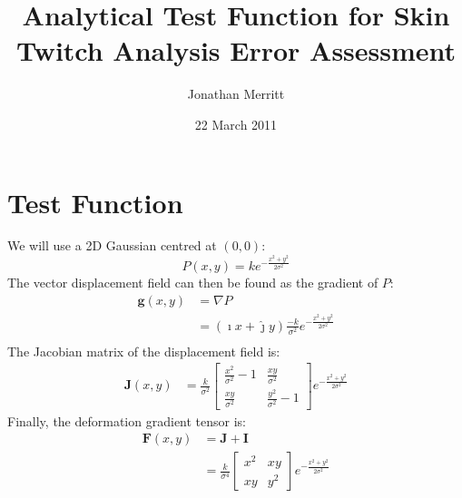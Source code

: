 \documentclass[a4paper,11pt,abstract=false]{scrartcl}
\title{Analytical Test Function for Skin Twitch Analysis Error Assessment}
\author{Jonathan Merritt}
\date{22 March 2011}
\newcommand{\vect}[1]{\ensuremath{\mathbf{#1}}}
\newcommand{\matr}[1]{\ensuremath{\mathbf{#1}}}
\newcommand{\eterm}{\ensuremath{e ^ {-\frac{x^2 + y^2}{2 \sigma^2}}}}
\begin{document}
\maketitle

\section{Test Function}

We will use a 2D Gaussian centred at $(0,0)$:
\begin{equation}
	P(x,y) = k \eterm
\end{equation}
The vector displacement field can then be found as the gradient of $P$:
\begin{equation}
	\begin{aligned}
		\vect{g}(x,y) &= \nabla P \\
		&= \left(\hat{\imath}x + \hat{\jmath}y\right)
			\frac{-k}{\sigma^2} \eterm \\
	\end{aligned}
\end{equation}
The Jacobian matrix of the displacement field is:
\begin{equation}
	\begin{aligned}
		\matr{J}(x,y) &= \frac{k}{\sigma^2} \begin{bmatrix}
			\frac{x^2}{\sigma^2}-1 & \frac{xy}{\sigma^2} \\
			\frac{xy}{\sigma^2} & \frac{y^2}{\sigma^2}-1
		\end{bmatrix} \eterm
	\end{aligned}
\end{equation}
Finally, the deformation gradient tensor is:
\begin{equation}
	\begin{aligned}
		\matr{F}(x,y) &= \matr{J} + \matr{I} \\
		&= \frac{k}{\sigma^4} \begin{bmatrix}
			x^2 & xy \\
			xy & y^2
		\end{bmatrix} \eterm
	\end{aligned}
\end{equation}
\end{document}
